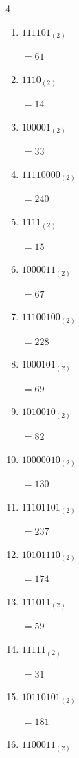 \begin{multicols}{4}
\begin{enumerate}
  \item $111101_{(2)}$

        $=61$

  \item $1110_{(2)}$

        $=14$

  \item $100001_{(2)}$

        $=33$

  \item $11110000_{(2)}$

        $=240$

  \item $1111_{(2)}$

        $=15$

  \item $1000011_{(2)}$

        $=67$

  \item $11100100_{(2)}$

        $=228$

  \item $1000101_{(2)}$

        $=69$

  \item $1010010_{(2)}$

        $=82$

  \item $10000010_{(2)}$

        $=130$

  \item $11101101_{(2)}$

        $=237$

  \item $10101110_{(2)}$

        $=174$

  \item $111011_{(2)}$

        $=59$

\columnbreak %

\resetques

  \item $11111_{(2)}$

        $=31$

  \item $10110101_{(2)}$

        $=181$

  \item $1100011_{(2)}$


\end{enumerate}
\end{multicols}
